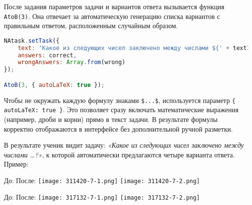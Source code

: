 После задания параметров задачи и вариантов ответа вызывается функция \verb|AtoB(3)|. 
Она отвечает за автоматическую генерацию списка вариантов с правильным ответом, расположенным случайным образом.  

\begin{lstlisting}[language=JavaScript]
NAtask.setTask({
    text: 'Какое из следующих чисел заключено между числами ${' + text1 + '}$ и ${' + text2 + '}$?',
    answers: correct,
    wrongAnswers: Array.from(wrong)
});

AtoB(3, { autoLaTeX: true });
\end{lstlisting}

Чтобы не окружать каждую формулу знаками \verb|$...$|, используется параметр \verb|{ autoLaTeX: true }|. 
Это позволяет сразу включать математические выражения (например, дроби и корни) прямо в текст задачи. 
В результате формулы корректно отображаются в интерфейсе без дополнительной ручной разметки.  

В результате ученик видит задачу: 
\textit{«Какое из следующих чисел заключено между числами …?»}, 
к которой автоматически предлагаются четыре варианта ответа.  
Пример:

 
До:
После:
\texttt{[image: 311420-7-1.png]}
\texttt{[image: 311420-7-2.png]}

 
До:
После:
\texttt{[image: 317132-7-1.png]}
\texttt{[image: 317132-7-2.png]}

